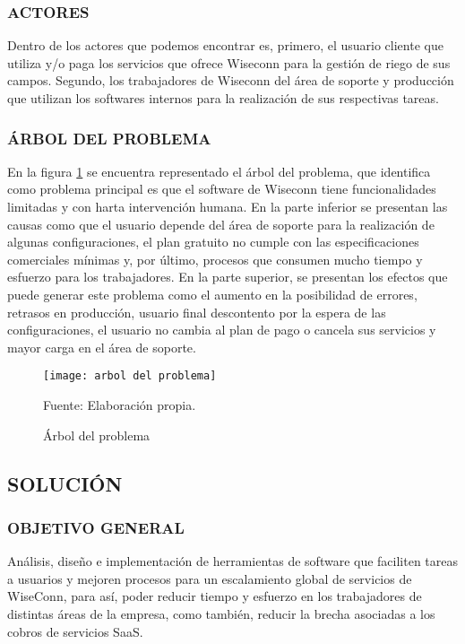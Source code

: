 \subsubsection{ACTORES}
Dentro de los actores que podemos encontrar es, primero, el usuario cliente que utiliza y/o paga los servicios que ofrece Wiseconn para la gestión de riego de sus campos. Segundo, los trabajadores de Wiseconn del área de soporte y producción que utilizan los softwares internos para la realización de sus respectivas tareas.

\subsubsection{ÁRBOL DEL PROBLEMA}
En la figura \ref{fig:arbolproblema} se encuentra representado el árbol del problema, que identifica como problema principal es que el software de Wiseconn tiene funcionalidades limitadas y con harta intervención humana.
En la parte inferior se presentan las causas como que el usuario depende del área de soporte para la realización de algunas configuraciones, el plan gratuito no cumple con las especificaciones comerciales mínimas y, por último, procesos que consumen mucho tiempo y esfuerzo para los trabajadores.
En la parte superior, se presentan los efectos que puede generar este problema como el aumento en la posibilidad de errores, retrasos en producción, usuario final descontento por la espera de las configuraciones, el usuario no cambia al plan de pago o cancela sus servicios y mayor carga en el área de soporte.

\begin{figure}
    \centering
	\texttt{[image: arbol del problema]}
	\caption{\label{fig:arbolproblema} Árbol del problema} Fuente: Elaboración propia.
\end{figure}

\subsection{SOLUCIÓN}

\subsubsection{OBJETIVO GENERAL}

Análisis, diseño e implementación de herramientas de software que faciliten tareas a usuarios y mejoren procesos para un escalamiento global de servicios de WiseConn, para así, poder reducir tiempo y esfuerzo en los trabajadores de distintas áreas de la empresa, como también, reducir la brecha asociadas a los cobros de servicios SaaS.

